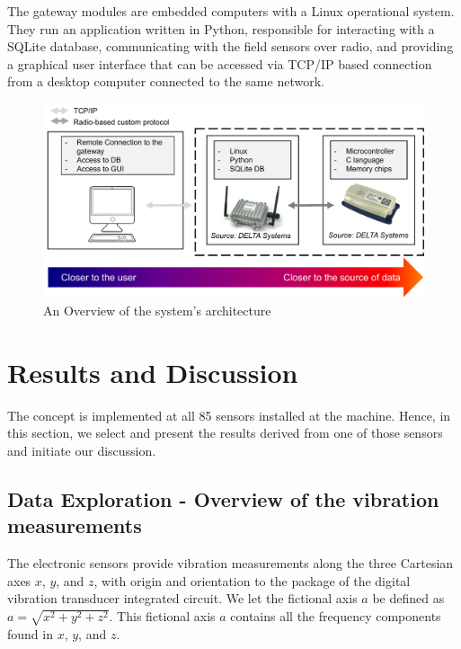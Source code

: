 \documentclass[conference]{IEEEtran}
\begin{document}
The gateway modules are embedded computers with a Linux operational system. They run an application written in Python, responsible for interacting with a SQLite database, communicating with the field sensors over radio, and providing a graphical user interface that can be accessed via TCP/IP based connection from a desktop computer connected to the same network. 

\begin{figure}[htbp]
\centerline{\includegraphics[width=\columnwidth]{graphics/concept/concept_pre_new.pdf}}
\caption{An Overview of the system's architecture}
\label{concept_pre}
\end{figure}

\section{Results and Discussion}
The concept is implemented at all 85 sensors installed at the machine. Hence, in this section, we select and present the results derived from one of those sensors and initiate our discussion. 
\label{sec_results_discussion}
\subsection{Data Exploration - Overview of the vibration measurements}

The electronic sensors provide vibration measurements along the three Cartesian axes $x$, $y$, and $z$, with origin and orientation to the package of the digital vibration transducer integrated circuit. We let the fictional axis $a$ be defined as $a = \sqrt{x^{2}+y^{2}+z^{2}}$. This fictional axis $a$ contains all the frequency components found in $x$, $y$, and $z$. 
\end{document}
